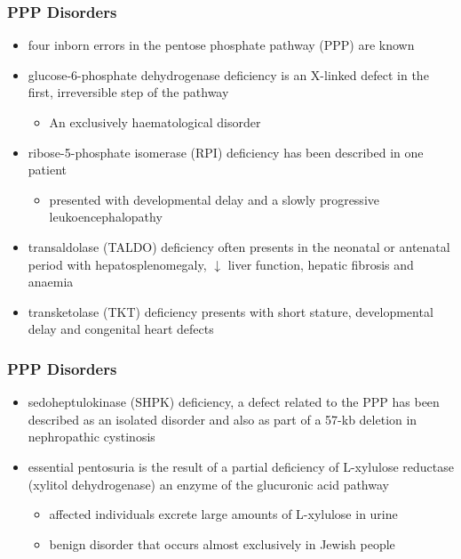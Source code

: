 \documentclass{scrartcl}
\begin{document}
\subsubsection{PPP Disorders}
\label{sec:orge41384b}

\begin{itemize}
\item four inborn errors in the pentose phosphate pathway (PPP) are known
\item glucose-6-phosphate dehydrogenase deficiency is an X-linked defect
in the first, irreversible step of the pathway
\begin{itemize}
\item An exclusively haematological disorder
\end{itemize}
\item ribose-5-phosphate isomerase (RPI) deficiency has been described in one patient
\begin{itemize}
\item presented with developmental delay and a slowly progressive leukoencephalopathy
\end{itemize}
\item transaldolase (TALDO) deficiency often presents in the neonatal or
antenatal period with hepatosplenomegaly, \(\downarrow\) liver function,
hepatic fibrosis and anaemia
\item transketolase (TKT) deficiency presents with short stature,
developmental delay and congenital heart defects
\end{itemize}

\subsubsection{PPP Disorders}
\label{sec:org131e30d}
\begin{itemize}
\item sedoheptulokinase (SHPK) deficiency, a defect related to the PPP has
been described as an isolated disorder and also as part of a 57-kb
deletion in nephropathic cystinosis
\item essential pentosuria is the result of a partial deficiency of
L-xylulose reductase (xylitol dehydrogenase) an enzyme of the
glucuronic acid pathway
\begin{itemize}
\item affected individuals excrete large amounts of L-xylulose in urine
\item benign disorder that occurs almost exclusively in Jewish people
\end{itemize}
\end{itemize}
\end{document}
